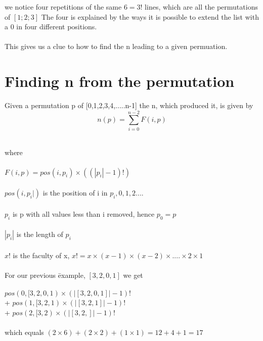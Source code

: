 \documentclass{article} %
\begin{document}
\noindent
we notice four repetitions of the same  \( 6 = 3!  \)  lines, which are all  the permutations of \( [ 1; 2; 3] \)  The four is explained by the ways it is possible to extend the list with a 0 in four different positions.  
\\
\\
This gives us a clue to how to find the n leading to a given permuation.
\newpage
\section{Finding n from the permutation}
\text
Given a permutation p  of [0,1,2,3,4,.....n-1] the n, which produced it, is given  by 
\[  
n(p) = \sum_{i = 0}^{n-2} F(i,p)
\]
\\
\begin{tabbing}

where\=
\\
\\
   \> \(  F(i,p) =  pos( i,  p_{i} )  \times (( | p_{i} |  - 1 )!)   \)
\\
\\
 \>  \(   pos( i,  p_{i} | )  \) is the position  of  i in  \(  p_{i} , 0,1,2 ....    \) 
\\
\\
       \>    \( p_{i}  \)  is p with all values less than i removed, hence  \( p_{0}  = p     \) 
\\
\\
    \>  \(  | p_{i} | \) is the length of  \(  p_{i}     \)  
\\
\\
  \>  \(  x!   \)  is the faculty of x, \( x!  = x \times   (x-1) \times   (x-2) \times ....  \times 2 \times 1 \)
\\
\\
For our previous \=example, \=   \(   [3 ,2, 0, 1 ]  \)   we get
\\
\\
\> \( pos(0,[3,2,0,1) \times ( |   [3 ,2, 0, 1 ] |-1) ! \)
\\
\>+   \(  pos(1,[3,2,1) \times ( |   [3 ,2, 1 ] |-1)!  \)
\\
\>+  \( pos(2,[3,2) \times ( |   [3 ,2,  ] |-1)  !  \) 
\\
\\
which equals \>  \(   ( 2 \times 6 ) + (2  \times 2 ) + ( 1 \times  1) =  12 +4 +1 = 17    \)
\end{tabbing}
\end{document}
